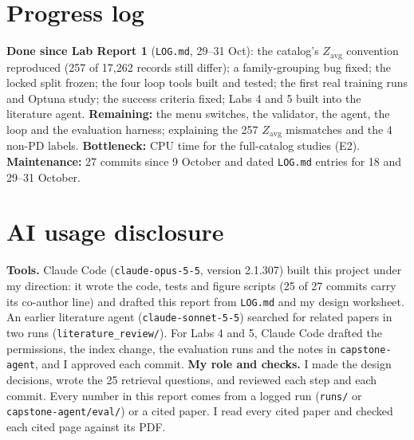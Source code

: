 \documentclass[11pt]{article}
\begin{document}
\section*{Progress log}
\textbf{Done since Lab Report 1} (\texttt{LOG.md}, 29--31 Oct): the catalog's $Z_\text{avg}$
convention reproduced (257 of 17,262 records still differ); a family-grouping bug fixed; the
locked split frozen; the four loop tools built and tested; the first real training runs and Optuna
study; the success criteria fixed; Labs 4 and 5 built into the literature agent.
\textbf{Remaining:} the menu switches, the validator, the agent, the loop and the evaluation
harness; explaining the 257 $Z_\text{avg}$ mismatches and the 4 non-PD labels.
\textbf{Bottleneck:} CPU time for the full-catalog studies (E2). \textbf{Maintenance:} 27 commits
since 9 October and dated \texttt{LOG.md} entries for 18 and 29--31 October.

\section*{AI usage disclosure}
\textbf{Tools.} Claude Code (\texttt{claude-opus-5-5}, version 2.1.307) built this project under my
direction: it wrote the code, tests and figure scripts (25 of 27 commits carry its co-author line)
and drafted this report from \texttt{LOG.md} and my design worksheet. An earlier literature agent
(\texttt{claude-sonnet-5-5}) searched for related papers in two runs (\texttt{literature\_review/}).
For Labs 4 and 5, Claude Code drafted the permissions, the index change, the evaluation runs and
the notes in \texttt{capstone-agent}, and I approved each commit. \textbf{My role and checks.} I
made the design decisions, wrote the 25 retrieval questions, and reviewed each step and each
commit. Every number in this report comes from a logged run (\texttt{runs/} or
\texttt{capstone-agent/eval/}) or a cited paper. I read every cited paper and checked each cited page
against its PDF.
\end{document}
